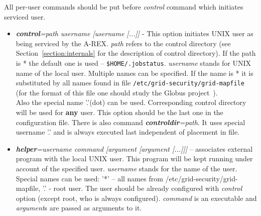 \documentclass{article}                            %
\begin{document}
All per-user commands should be put before \textit{control} command
which initiates serviced user.

\begin{itemize}
\item \textbf{\textit{control}}\textit{=path username {[}username {[}...]]}
- This option initiates UNIX user as being serviced by the A-REX.
\textit{path} refers to the control directory (see Section~\ref{section:internals}
for the description of control directory). If the path is {*} the
default one is used -- \verb|$HOME/.jobstatus|. \textit{username} stands
for UNIX name of the local user. Multiple names can be specified.
If the name is {*} it is substituted by all names found in file \texttt{/etc/grid-security/grid-mapfile}
(for the format of this file one should study the Globus project~\cite{globus}).\\
Also the special name '.'(dot) can be used. Corresponding control
directory will be used for \textbf{any} user. This option should be
the last one in the configuration file. There is also command \textbf{\textit{controldir}}\textit{=path}.
It uses special username '.' and is always executed last independent
of placement in file.
\item \textbf{\textit{helper}}\textit{=username command {[}argument {[}argument
{[}...]]]} -- associates external program with the local UNIX user.
This program will be kept running under account of the specified user.
\textit{username} stands for the name of the user. Special names can
be used: '{*}' -- all names from /etc/grid-security/grid-mapfile, '.'
- root user. The user should be already configured with \textit{control}
option (except root, who is always configured). \textit{command} is
an executable and \textit{argument}s are passed as arguments to it.
\end{itemize}

\end{document}
